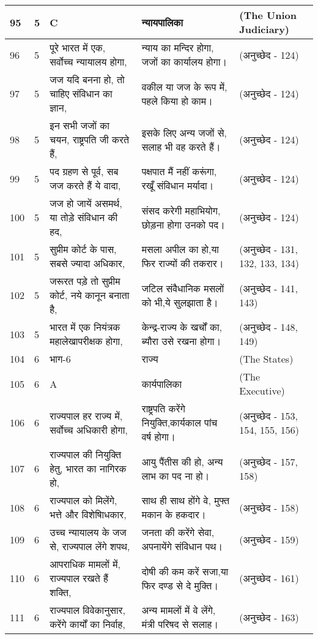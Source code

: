\begin{longtable}{|l|l|l|l|l|}
95 & 5 & C & न्यायपालिका  & (The Union Judiciary) \\ \hline 
96 & 5 & पूरे भारत में एक, सर्वोच्च न्यायालय होगा, & न्याय का मन्दिर होगा, जजों का कार्यालय होगा। & (अनुच्छेद - 124) \\ \hline 
97 & 5 & जज यदि बनना हो, तो चाहिए संविधान का ज्ञान, & वकील या जज के रूप में, पहले किया हो काम। & (अनुच्छेद - 124) \\ \hline 
98 & 5 & इन सभी जजों का चयन, राष्ट्रपति जी करते हैं, & इसके लिए अन्य जजों से, सलाह भी वह करते हैं। & (अनुच्छेद - 124) \\ \hline 
99 & 5 & पद ग्रहण से पूर्व, सब जज करते हैं ये वादा, & पक्षपात मैं नहीं करूंगा, रखूँ संविधान मर्यादा। & (अनुच्छेद - 124) \\ \hline 
100 & 5 & जज हो जायें असमर्थ, या तोड़े संविधान की हद, & संसद करेगी महाभियोग, छोड़ना होगा उनको पद। & (अनुच्छेद - 124) \\ \hline 
101 & 5 & सुप्रीम कोर्ट के पास, सबसे ज्यादा अधिकार, & मसला अपील का हो,या फिर राज्यों की तकरार। & (अनुच्छेद - 131, 132, 133, 134) \\ \hline 
102 & 5 & जरूरत पड़े तो सुप्रीम कोर्ट, नये कानून बनाता है, & जटिल संवैधानिक मसलों को भी,ये सुलझाता है। & (अनुच्छेद - 141, 143) \\ \hline 
103 & 5 & भारत में एक नियंत्रक महालेखापरीक्षक होगा, & केन्द्र-राज्य के खर्चों का, ब्यौरा उसे रखना होगा। & (अनुच्छेद - 148, 149) \\ \hline 
104 & 6 & भाग-6 & राज्य  & (The States) \\ \hline 
105 & 6 & A & कार्यपालिका  & (The Executive) \\ \hline 
106 & 6 & राज्यपाल हर राज्य में, सर्वोच्च अधिकारी होगा, & राष्ट्रपति करेंगे नियुक्ति,कार्यकाल पांच वर्ष होगा। & (अनुच्छेद - 153, 154, 155, 156) \\ \hline 
107 & 6 & राज्यपाल की नियुक्ति हेतु, भारत का नागिरक हो, & आयु पैंतीस की हो, अन्य लाभ का पद ना हो। & (अनुच्छेद - 157, 158) \\ \hline 
108 & 6 & राज्यपाल को मिलेंगे, भत्ते और विशेषािधकार, & साथ ही साथ होंगे वे, मुफ्त मकान के हकदार। & (अनुच्छेद - 158) \\ \hline 
109 & 6 & उच्च न्यायालय के जज से, राज्यपाल लेंगे शपथ, & जनता की करेंगे सेवा, अपनायेंगे संविधान पथ। & (अनुच्छेद - 159) \\ \hline 
110 & 6 & आपराधिक मामलों में, राज्यपाल रखते हैं शक्ति, & दोषी की कम करें सजा,या फिर दण्ड से दे मुक्ति। & (अनुच्छेद - 161) \\ \hline 
111 & 6 & राज्यपाल विवेकानुसार, करेंगे कार्यों का निर्वाह, & अन्य मामलों में वे लेंगे, मंत्री परिषद से सलाह। & (अनुच्छेद - 163) \\ \hline 

\end{longtable}

